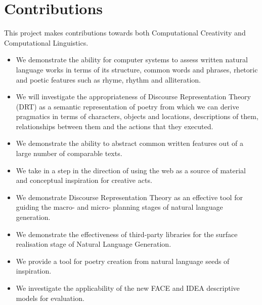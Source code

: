 \section{Contributions}
This project makes contributions towards both Computational Creativity and Computational Linguistics.
\begin{itemize}
\item{We demonstrate the ability for computer systems to assess written natural language works in terms of its structure, common words and phrases, rhetoric and poetic features such as rhyme, rhythm and alliteration.}
\item{We will investigate the appropriateness of Discourse Representation Theory (DRT) as a semantic representation of poetry from which we can derive pragmatics in terms of characters, objects and locations, descriptions of them, relationships between them and the actions that they executed.}
\item {We demonstrate the ability to abstract common written features out of a large number of comparable texts.}
\item{We take in a step in the direction of using the web as a source of material and conceptual inspiration for creative acts.}
\item{We demonstrate Discourse Representation Theory as an effective tool for guiding the macro- and micro- planning stages of natural language generation.}
\item{We demonstrate the effectiveness of third-party libraries for the surface realisation stage of Natural Language Generation.}
\item{We provide a tool for poetry creation from natural language seeds of inspiration.}
\item{We investigate the applicability of the new FACE and IDEA descriptive models for evaluation.}
\end{itemize}



